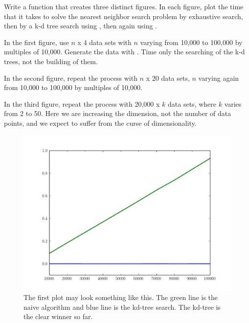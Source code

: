 \begin{problem}
Write a function that creates three distinct figures.
In each figure, plot the time that it takes to solve the nearest neighbor search problem by exhaustive search, then by a k-d tree search using , then again using .

In the first figure, use $n$ x 4 data sets with $n$ varying from 10,000 to 100,000 by multiples of 10,000.
Generate the data with .
Time only the searching of the k-d trees, not the building of them.

In the second figure, repeat the process with $n$ x 20 data sets, $n$ varying again from 10,000 to 100,000 by multiples of 10,000.

In the third figure, repeat the process with 20,000 x $k$ data sets, where $k$ varies from 2 to 50.
Here we are increasing the dimension, not the number of data points, and we expect to suffer from the curse of dimensionality.

\begin{figure}[H]
\includegraphics[width=\textwidth]{fourDTime.pdf}
\caption{The first plot may look something like this.
The green line is the naive algorithm and blue line is the kd-tree search.
The kd-tree is the clear winner so far.}
\label{fig:fourDTime}
\end{figure}


\end{problem}
